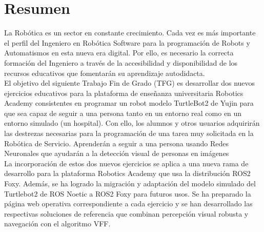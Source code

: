 \chapter*{Resumen}

La Robótica es un sector en constante crecimiento. Cada vez es más importante el perfil del Ingeniero en Robótica Software para la programación de Robots y Automatismos en esta nueva era digital. Por ello, es necesario la correcta formación del Ingeniero a través de la accesibilidad y disponibilidad de los recursos educativos que fomentarán su aprendizaje autodidacta.\\

El objetivo del siguiente Trabajo Fin de Grado (TFG) es desarrollar dos nuevos ejercicios educativos para la plataforma de enseñanza universitaria Robotics Academy consistentes en programar un robot modelo TurtleBot2 de Yujin para que sea capaz de seguir a una persona tanto en un entorno real como en un entorno simulado (un hospital). Con ello, los alumnos y otros usuarios adquirirán las destrezas necesarias para la programación de una tarea muy solicitada en la Robótica de Servicio. Aprenderán a seguir a una persona usando Redes Neuronales que ayudarán a la detección visual de personas en imágenes\\

La incorporación de estos dos nuevos ejercicios se aplica a una nueva rama de desarrollo para la plataforma Robotics Academy que usa la distribución ROS2 Foxy. Además, se ha logrado la migración y adaptación del modelo simulado del Turtlebot2 de ROS Noetic a ROS2 Foxy para futuros usos. Se ha preparado la página web operativa correspondiente a cada ejercicio y se han desarrollado las respectivas soluciones de referencia que combinan percepción visual robusta y navegación con el algoritmo VFF.